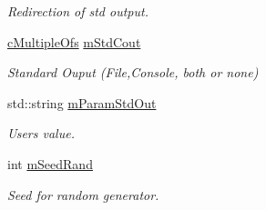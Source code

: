 \begin{DoxyCompactItemize}
\begin{DoxyCompactList}\small\item\em Redirection of std output. \end{DoxyCompactList}\item 
\hyperlink{classMMVII_1_1cMultipleOfs}{c\+Multiple\+Ofs} \hyperlink{classMMVII_1_1cMMVII__Appli_ab9332c2d0457538973077e9e2dca3609}{m\+Std\+Cout}\hypertarget{classMMVII_1_1cMMVII__Appli_ab9332c2d0457538973077e9e2dca3609}{}\label{classMMVII_1_1cMMVII__Appli_ab9332c2d0457538973077e9e2dca3609}

\begin{DoxyCompactList}\small\item\em Standard Ouput (File,Console, both or none) \end{DoxyCompactList}\item 
std\+::string \hyperlink{classMMVII_1_1cMMVII__Appli_a4271799db9866d8ed5b194e2022633d0}{m\+Param\+Std\+Out}\hypertarget{classMMVII_1_1cMMVII__Appli_a4271799db9866d8ed5b194e2022633d0}{}\label{classMMVII_1_1cMMVII__Appli_a4271799db9866d8ed5b194e2022633d0}

\begin{DoxyCompactList}\small\item\em Users value. \end{DoxyCompactList}\item 
int \hyperlink{classMMVII_1_1cMMVII__Appli_a52b203a011f0a75f962d690fa45e3803}{m\+Seed\+Rand}\hypertarget{classMMVII_1_1cMMVII__Appli_a52b203a011f0a75f962d690fa45e3803}{}\label{classMMVII_1_1cMMVII__Appli_a52b203a011f0a75f962d690fa45e3803}

\begin{DoxyCompactList}\small\item\em Seed for random generator. \end{DoxyCompactList}\end{DoxyCompactItemize}

